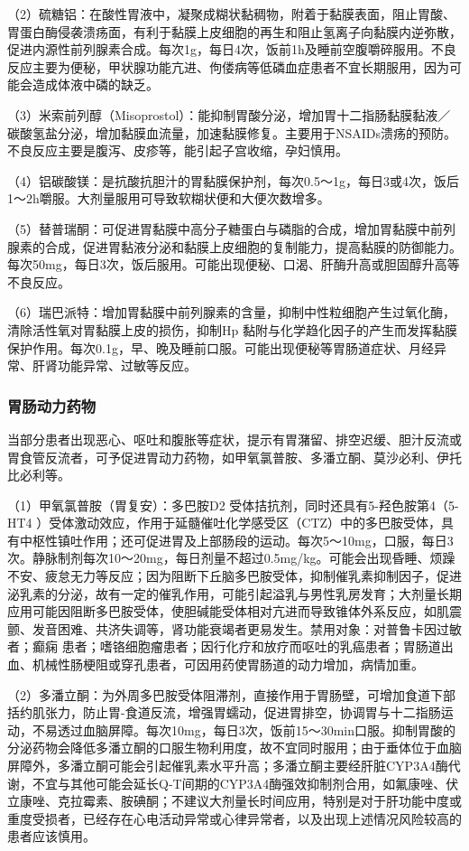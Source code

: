 （2）硫糖铝：在酸性胃液中，凝聚成糊状黏稠物，附着于黏膜表面，阻止胃酸、胃蛋白酶侵袭溃疡面，有利于黏膜上皮细胞的再生和阻止氢离子向黏膜内逆弥散，促进内源性前列腺素合成。每次1g，每日4次，饭前1h及睡前空腹嚼碎服用。不良反应主要为便秘，甲状腺功能亢进、佝偻病等低磷血症患者不宜长期服用，因为可能会造成体液中磷的缺乏。

（3）米索前列醇（Misoprostol）：能抑制胃酸分泌，增加胃十二指肠黏膜黏液／碳酸氢盐分泌，增加黏膜血流量，加速黏膜修复。主要用于NSAIDs溃疡的预防。不良反应主要是腹泻、皮疹等，能引起子宫收缩，孕妇慎用。

（4）铝碳酸镁：是抗酸抗胆汁的胃黏膜保护剂，每次0.5～1g，每日3或4次，饭后1～2h嚼服。大剂量服用可导致软糊状便和大便次数增多。

（5）替普瑞酮：可促进胃黏膜中高分子糖蛋白与磷脂的合成，增加胃黏膜中前列腺素的合成，促进胃黏液分泌和黏膜上皮细胞的复制能力，提高黏膜的防御能力。每次50mg，每日3次，饭后服用。可能出现便秘、口渴、肝酶升高或胆固醇升高等不良反应。

（6）瑞巴派特：增加胃黏膜中前列腺素的含量，抑制中性粒细胞产生过氧化酶，清除活性氧对胃黏膜上皮的损伤，抑制{Hp}
黏附与化学趋化因子的产生而发挥黏膜保护作用。每次0.1g，早、晚及睡前口服。可能出现便秘等胃肠道症状、月经异常、肝肾功能异常、过敏等反应。

\subsubsection{胃肠动力药物}

当部分患者出现恶心、呕吐和腹胀等症状，提示有胃潴留、排空迟缓、胆汁反流或胃食管反流者，可予促进胃动力药物，如甲氧氯普胺、多潘立酮、莫沙必利、伊托比必利等。

（1）甲氧氯普胺（胃复安）：多巴胺D{2}
受体拮抗剂，同时还具有5-羟色胺第4（5-HT{4}
）受体激动效应，作用于延髓催吐化学感受区（CTZ）中的多巴胺受体，具有中枢性镇吐作用；还可促进胃及上部肠段的运动。每次5～10mg，口服，每日3次。静脉制剂每次10～20mg，每日剂量不超过0.5mg/kg。可能会出现昏睡、烦躁不安、疲怠无力等反应；因为阻断下丘脑多巴胺受体，抑制催乳素抑制因子，促进泌乳素的分泌，故有一定的催乳作用，可能引起溢乳与男性乳房发育；大剂量长期应用可能因阻断多巴胺受体，使胆碱能受体相对亢进而导致锥体外系反应，如肌震颤、发音困难、共济失调等，肾功能衰竭者更易发生。禁用对象：对普鲁卡因过敏者；癫痫
患者；嗜铬细胞瘤患者；因行化疗和放疗而呕吐的乳癌患者；胃肠道出血、机械性肠梗阻或穿孔患者，可因用药使胃肠道的动力增加，病情加重。

（2）多潘立酮：为外周多巴胺受体阻滞剂，直接作用于胃肠壁，可增加食道下部括约肌张力，防止胃-食道反流，增强胃蠕动，促进胃排空，协调胃与十二指肠运动，不易透过血脑屏障。每次10mg，每日3次，饭前15～30min口服。抑制胃酸的分泌药物会降低多潘立酮的口服生物利用度，故不宜同时服用；由于垂体位于血脑屏障外，多潘立酮可能会引起催乳素水平升高；多潘立酮主要经肝脏CYP3A4酶代谢，不宜与其他可能会延长Q-T间期的CYP3A4酶强效抑制剂合用，如氟康唑、伏立康唑、克拉霉素、胺碘酮；不建议大剂量长时间应用，特别是对于肝功能中度或重度受损者，已经存在心电活动异常或心律异常者，以及出现上述情况风险较高的患者应该慎用。

